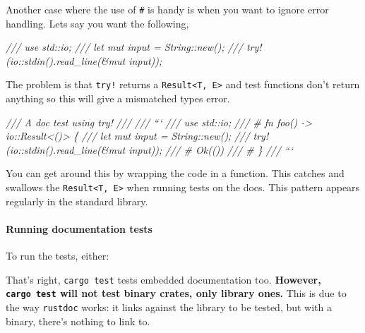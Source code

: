 \documentclass[a4paper,]{book}
\newenvironment{Shaded}{\begin{snugshade}}{\end{snugshade}}
\newcommand{\KeywordTok}[1]{\textcolor[rgb]{0.13,0.29,0.53}{\textbf{{#1}}}}
\newcommand{\CommentTok}[1]{\textcolor[rgb]{0.56,0.35,0.01}{\textit{{#1}}}}
\newcommand{\NormalTok}[1]{{#1}}
\let\oldparagraph\paragraph
\renewcommand{\paragraph}[1]{\oldparagraph{#1}\mbox{}}
\begin{document}
Another case where the use of \texttt{\#} is handy is when you want to
ignore error handling. Lets say you want the following,

\begin{Shaded}
\begin{Highlighting}[]
\CommentTok{/// use std::io;}
\CommentTok{/// let mut input = String::new();}
\CommentTok{/// try!(io::stdin().read_line(&mut input));}
\end{Highlighting}
\end{Shaded}

The problem is that \texttt{try!} returns a
\texttt{Result\textless{}T,\ E\textgreater{}} and test functions don't
return anything so this will give a mismatched types error.

\begin{Shaded}
\begin{Highlighting}[]
\CommentTok{/// A doc test using try!}
\CommentTok{///}
\CommentTok{/// ```}
\CommentTok{/// use std::io;}
\CommentTok{/// # fn foo() -> io::Result<()> \{}
\CommentTok{/// let mut input = String::new();}
\CommentTok{/// try!(io::stdin().read_line(&mut input));}
\CommentTok{/// # Ok(())}
\CommentTok{/// # \}}
\CommentTok{/// ```}
\end{Highlighting}
\end{Shaded}

You can get around this by wrapping the code in a function. This catches
and swallows the \texttt{Result\textless{}T,\ E\textgreater{}} when
running tests on the docs. This pattern appears regularly in the
standard library.

\paragraph{Running documentation
tests}\label{running-documentation-tests}

To run the tests, either:

\begin{Shaded}
\end{Shaded}

That's right, \texttt{cargo\ test} tests embedded documentation too.
\textbf{However, \texttt{cargo\ test} will not test binary crates, only
library ones.} This is due to the way \texttt{rustdoc} works: it links
against the library to be tested, but with a binary, there's nothing to
link to.
\end{document}
